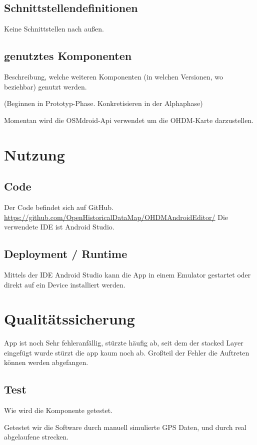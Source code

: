 \subsection{Schnittstellendefinitionen}

Keine Schnittstellen nach außen.

\subsection{genutztes Komponenten}
Beschreibung, welche weiteren Komponenten (in welchen Versionen, wo beziehbar) genutzt werden.

(Beginnen in Prototyp-Phase. Konkretisieren in der Alphaphase)

Momentan wird die OSMdroid-Api verwendet um die OHDM-Karte darzustellen.

\section{Nutzung}
\subsection{Code}
Der Code befindet sich auf GitHub. \url{https://github.com/OpenHistoricalDataMap/OHDMAndroidEditor/}
Die verwendete IDE ist Android Studio.

\subsection{Deployment / Runtime}
Mittels der IDE Android Studio kann die App in einem Emulator gestartet oder direkt auf ein Device installiert werden.

\section{Qualitätssicherung}

App ist noch Sehr fehleranfällig, stürzte häufig ab, seit dem der stacked Layer eingefügt wurde stürzt die app kaum noch ab.
Großteil der Fehler die Auftreten können werden abgefangen.


\subsection{Test}
Wie wird die Komponente getestet.

Getestet wir die Software durch manuell simulierte GPS Daten, und durch real abgelaufene strecken.

